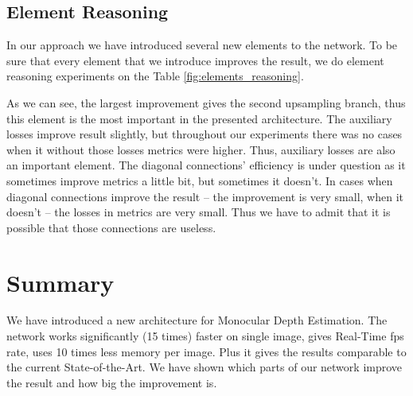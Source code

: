 \documentclass[10pt,twocolumn,letterpaper]{article}
\begin{document}
\subsection{Element Reasoning}

In our approach we have introduced several new elements to the network.
To be sure that every element that we introduce improves the result, 
we do element reasoning experiments on the Table \ref{fig:elements_reasoning}.

As we can see, the largest improvement gives the second upsampling branch, thus
this element is the most important in the presented architecture.
The auxiliary losses improve result slightly, but throughout our experiments there
was no cases when it without those losses metrics were higher. Thus, 
auxiliary losses are also an important
element. The diagonal connections' efficiency is under question as it sometimes
improve metrics a little bit, but sometimes it doesn't. In cases when diagonal connections
improve the result -- the improvement is very small, when it doesn't -- the losses in metrics 
are very small. Thus we have to admit that it is possible that those connections are useless.



\section{Summary}

We have introduced a new architecture for Monocular Depth Estimation. The network works
significantly (15 times) faster on single image, gives Real-Time fps rate, 
uses 10 times less memory per image.
Plus it gives the results comparable to the current State-of-the-Art. 
We have shown which parts of
our network improve the result and how big the improvement is.




{\small


}
\end{document}
